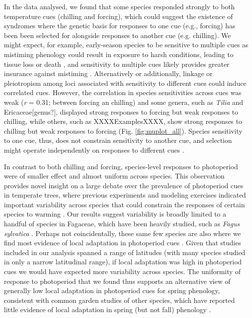 \documentclass{article}\usepackage[]{graphicx}\usepackage[]{color}
\begin{document}
In the data analysed, we found that some species responded strongly to both temperature cues (chilling and forcing), which could suggest the existence of syndromes where the genetic basis for responses to one cue (e.g., forcing) has been been selected for alongside responses to another cue (e.g. chilling). We might expect, for example, early-season species to be sensitive to multiple cues as mistiming phenology could result in exposure to harsh conditions, leading to tissue loss or death \citep{frostbook}, and sensitivity to multiple cues likely provides greater insurance against mistiming \citep{memegan2021}. Alternatively or additionally, linkage or pleiotropism among loci associated with sensitivity to different cues \citep{nakagawa2005} could induce correlated cues. However, the correlation in species sensitivities across cues was weak (\emph{r} = 0.31; between forcing an chilling) and some genera, such as \emph{Tilia} and Ericaceae[genus?], displayed strong responses to forcing but weak responses to chilling, while others, such as XXXXExamplesXXXX, show strong responses to chilling but weak responses to forcing (Fig. \ref{fig:muplot_all}). Species sensitivity to one cue, thus, does not constrain sensitivity to another cue, and selection might operate independently on responses to different cues \citep{bonamour2019}.

In contrast to both chilling and forcing, species-level responses to photoperiod were of smaller effect and almost uniform across species. This observation provides novel insight on a large debate over the prevalence of photoperiod cues in temperate trees, where previous experiments  \citep{Basler:2012,zohner2016} and modeling exercises \citep[e.g.,][]{Hunter:1992jw,schaber20203} indicated important variability across species that could constrain the responses of certain species to warming \citep{way2015}. Our results suggest variability is broadly limited to a handful of species in Fagaceae, which have been heavily studied, such as \emph{Fagus sylvatica} \citep[e.g.,][]{Basler:2012,zohner2016,kramer2017}. Perhaps not coincidentally, these same few species are also where we find most evidence of local adaptation in photoperiod cues \citep[e.g.,][]{kramer2017}. Given that studies included in our analysis spanned a range of latitudes (with many species studied in only a narrow latitudinal range), if local adaptation was high in photoperiod cues we would have expected more variability across species. The uniformity of response to photoperiod that we found thus supports an alternative view of generally low local adaptation in photoperiod cues for spring phenology, consistent with common garden studies of other species, which have reported little evidence of local adaptation in spring (but not fall) phenology \citep{aitken2016}.
\end{document}
